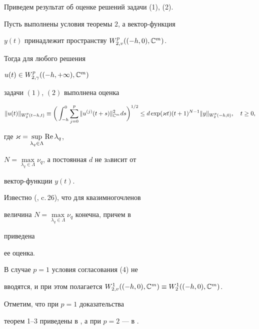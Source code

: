  


Приведем результат об оценке решений задачи (1), (2). 


 


\begin{thm} 


Пусть выполнены условия теоремы $2$, а вектор-функция 


$y(t)$ принадлежит пространству $W^p_{2,v}((-h,0),\Bbb C^m)$. 


Тогда для любого решения 


$u(t)\in W^p_{2,\gamma}((-h,+\infty),\Bbb C^m)$ 


задачи $(1)$, $(2)$ выполнена оценка 


\begin{equation} 


\|u(t)\|_{W^p_2(t-h,t)}\equiv\bigg(\int^0_{-h} 


\sum^p_{j=0}\|u^{(j)}(t+s)\|^2_{\Bbb C^m}d s\bigg)^{1/2}\le 


d\exp(\varkappa t)(t+1)^{N-1}\|y\|_{W^p_2(-h,0)},\quad t\ge0, 


\end{equation} 


где $\varkappa=\sup\limits_{\lambda_q\in\Lambda}\operatorname{Re}\lambda_q$, 


$N=\max\limits_{\lambda_q\in\Lambda}\nu_q$, а постоянная $d$ не зaвисит от 


вектор-функции $y(t)$. 


\end{thm} 


 


\begin{note} 


Известно (\cite{4}, c.\,26), что для квазимногочленов 


величина $N=\max\limits_{\lambda_q\in\Lambda}\nu_q$ конечна, причем в 


\cite{4} приведена 


ее оценка. 


\end{note} 


 


\begin{note} 


В случае $p=1$ условия согласования (4) не 


вводятся, и при этом полагается $W^1_{2,v}((-h,0),\Bbb C^m)\equiv 


W^1_2((-h,0),\Bbb C^m)$. 


Отметим, что при $p=1$ доказательства 


теорем 1--3 приведены в \cite{11}, а при $p=2$ --- в \cite{16}. 


\end{note} 


